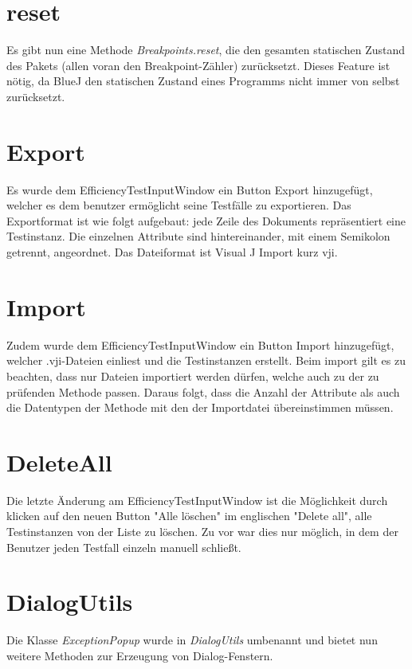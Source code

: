 \documentclass[a4paper]{report}
\begin{document}
\section{reset}

Es gibt nun eine Methode \emph{Breakpoints.reset}, die den gesamten statischen Zustand des Pakets (allen voran den Breakpoint-Zähler) zurücksetzt. Dieses Feature ist nötig, da BlueJ den statischen Zustand eines Programms nicht immer von selbst zurücksetzt.

\section{Export}

Es wurde dem EfficiencyTestInputWindow ein Button Export hinzugefügt, welcher es dem benutzer ermöglicht seine Testfälle zu exportieren. Das Exportformat ist wie folgt aufgebaut: jede Zeile des Dokuments repräsentiert eine Testinstanz. Die einzelnen Attribute sind hintereinander, mit einem Semikolon getrennt, angeordnet. Das Dateiformat ist Visual J Import kurz vji.

\section{Import}

Zudem wurde dem EfficiencyTestInputWindow ein Button Import hinzugefügt, welcher .vji-Dateien einliest und die Testinstanzen erstellt. Beim import gilt es zu beachten, dass nur Dateien importiert werden dürfen, welche auch zu der zu prüfenden Methode passen. Daraus folgt, dass die Anzahl der Attribute als auch die Datentypen der Methode mit den der Importdatei übereinstimmen müssen.

\section{DeleteAll}

Die letzte Änderung am EfficiencyTestInputWindow ist die Möglichkeit durch klicken auf den neuen Button "Alle löschen" im englischen "Delete all", alle Testinstanzen von der Liste zu löschen. Zu vor war dies nur möglich, in dem der Benutzer jeden Testfall einzeln manuell schließt.

\section{DialogUtils}

Die Klasse \emph{ExceptionPopup} wurde in \emph{DialogUtils} umbenannt und bietet nun weitere Methoden zur Erzeugung von Dialog-Fenstern.
\end{document}
